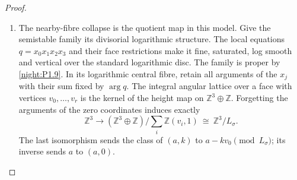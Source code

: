 \begin{proof}
\begin{enumerate}[label={$\langle1\rangle$\arabic*.}]
On a shared face put
$\mathcal A_\sigma=2D_\sigma\cap A^\vee$ and choose
$m_0\in\mathcal A_\sigma$.
For $m\in\mathcal A_\sigma$, the difference $m-m_0$ annihilates
$L_\sigma$.  The ratio $Z_m/Z_{m_0}$ is consequently the restriction
of the same character
\[
 \bigl(-(m-m_0),\langle m-m_0,v\rangle\bigr)
       \in(A\oplus\mathbb Z)^\vee
\]
for every vertex $v$ of $\sigma$.  At $C=0$ all deck unit multipliers are one, and the toric gluing
identifies these character functions exactly.  On either component
the restricted moment map is therefore the identical expression
\[
 \frac{\sum_{m\in\mathcal A_\sigma}
       m|\chi^{-(m-m_0)}|^2}
 {2\sum_{m\in\mathcal A_\sigma}|\chi^{-(m-m_0)}|^2}.
\]
The equality persists on every smaller face by restricting the index
set.  Positive character values also agree, so the sections $s_v$
glue on the entire shared orbit closure.  The angular maps are the
displayed quotient homomorphisms $A\to A/L_\sigma$.

The period deck map is $(a,k)\mapsto(a+k\nu,k)$, sending $v$ to
$v+\nu$.  Its component marking is unchanged because
$a+k\nu-k(v+\nu)=a-kv$.
Moreover $\mathcal A_{v+\nu}=\mathcal A_v+2G\nu$; the common
character factor cancels in projective ratios.  Hence
\[
 \mu_{v+\nu}(T_\nu p)=\mu_v(p)+G\nu,
 \qquad s_{v+\nu}(y+G\nu)=T_\nu s_v(y).
\]
These give an explicit well-defined map
\[
 \begin{gathered}
 \mathcal Q=
 \bigl((\mathbb R^3/G\mathbb Z^3)\times
       (\mathbb R^3/\mathbb Z^3)\bigr)/\!\sim
 \longrightarrow C,\\
 [y,\theta]\longmapsto e^{2\pi i\theta}\,s_v(y)
 \quad(y\in P_v).
 \end{gathered}
\]
where over $\operatorname{relint}D_\sigma$ the relation collapses
the subtorus $L_\sigma\otimes(\mathbb R/\mathbb Z)$.
On each stratum the inverse takes its moment value and its angular
character class in $T_A/T_{L_\sigma}$; the latter is obtained by
$z\mapsto z/|z|$ on its nonzero characters.
The map is a continuous bijection, and its source is compact and
$C$ Hausdorff, so it is a homeomorphism.
The angular identity $[y,0]$ gives the continuous section, with
the same face and deck compatibilities just proved.

\item The nearby-fibre collapse is the quotient map in this model.
Give the semistable family its divisorial logarithmic structure.
The local equations $q=x_0x_1x_2x_3$ and their face restrictions
make it fine, saturated, log smooth and vertical over the standard
logarithmic disc.  The family is proper by \cref{night:P1.9}.
In its logarithmic central fibre, retain all arguments of the $x_j$
with their sum fixed by $\arg q$.  The integral angular lattice over
a face with vertices $v_0,\ldots,v_r$ is the kernel of the height
map on $\mathbb Z^3\oplus\mathbb Z$.  Forgetting the arguments of
the zero coordinates induces exactly
\[
 \mathbb Z^3\longrightarrow
 (\mathbb Z^3\oplus\mathbb Z)/
       \sum_i\mathbb Z(v_i,1)
 \ \cong\ \mathbb Z^3/L_\sigma.
\]
The last isomorphism sends the class of $(a,k)$ to
$a-kv_0\pmod {L_\sigma}$; its inverse sends $a$ to $(a,0)$.


\end{enumerate}
\end{proof}
